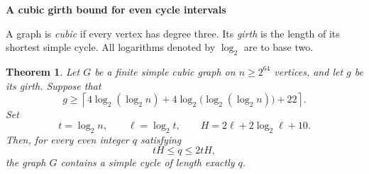 \documentclass[11pt,a4paper]{article}
\newtheorem*{theorem}{Theorem}
\begin{document}
\begin{center}
  {\Large\bfseries A cubic girth bound for even cycle intervals}
\end{center}
\vspace{0.4\baselineskip}

A graph is \emph{cubic} if every vertex has degree three. Its \emph{girth}
is the length of its shortest simple cycle. All logarithms denoted by
$\log_2$ are to base two.

\begin{theorem}
Let $G$ be a finite simple cubic graph on $n\ge2^{64}$ vertices, and let
$g$ be its girth. Suppose that
\begin{equation}\label{eq:hypothesis}
 g\ge
 \left\lceil
 4\log_2(\log_2 n)
 +4\log_2\bigl(\log_2(\log_2 n)\bigr)+22
 \right\rceil.
\end{equation}
Set
\begin{equation}\label{eq:main-parameters}
 t=\log_2 n,\qquad
 \ell=\log_2 t,\qquad
 H=2\ell+2\log_2\ell+10.
\end{equation}
Then, for every even integer $q$ satisfying
\begin{equation}\label{eq:q-range}
 tH\le q\le2tH,
\end{equation}
the graph $G$ contains a simple cycle of length exactly $q$.
\end{theorem}
\end{document}
